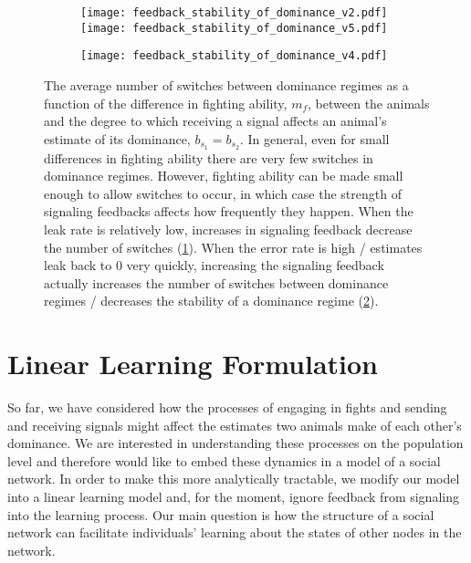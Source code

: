 \documentclass{article}
\begin{document}
\begin{figure}
\begin{subfigure}{1 \textwidth}
\texttt{[image: feedback\_stability\_of\_dominance\_v2.pdf]}
\texttt{[image: feedback\_stability\_of\_dominance\_v5.pdf]}
\caption{\label{low_error}}
\end{subfigure}
\begin{subfigure}{1 \textwidth}
\texttt{[image: feedback\_stability\_of\_dominance\_v4.pdf]}
\caption{\label{high_error}}
\end{subfigure}
\caption{\label{diff_switches} The average number of switches between dominance regimes as a function of the difference in fighting ability, $m_f$, between the animals and the degree to which receiving a signal affects an animal's estimate of its dominance, $b_{s_1}=b_{s_2}$.  In general, even for small differences in fighting ability there are very few switches in dominance regimes.  However, fighting ability can be made small enough to allow switches to occur, in which case the strength of signaling feedbacks affects how frequently they happen.  When the leak rate is relatively low, increases in signaling feedback decrease the number of switches (\ref{low_error}).  When the error rate is high / estimates leak back to $0$ very quickly, increasing the signaling feedback actually increases the number of switches between dominance regimes / decreases the stability of a dominance regime (\ref{high_error}).}
\end{figure}

\section{Linear Learning Formulation}

So far, we have considered how the processes of engaging in fights and sending and receiving signals might affect the estimates two animals make of each other's dominance.  We are interested in understanding these processes on the population level and therefore would like to embed these dynamics in a model of a social network.  In order to make this more analytically tractable, we modify our model into a linear learning model and, for the moment, ignore feedback from signaling into the learning process.  Our main question is how the structure of a social network can facilitate individuals' learning about the states of other nodes in the network.
\end{document}
